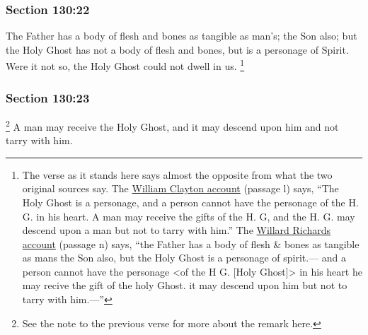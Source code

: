 	\subsubsection{Section 130:22} %
		\label{DC130-22}

		The Father has a body of flesh and bones as tangible as man's; the Son also; but the Holy Ghost has not a body of flesh and bones, but is a personage of Spirit. Were it not so, the Holy Ghost could not dwell in us.%
			\footnote{%
				The verse as it stands here says almost the opposite from what the two original sources say. The \hyperlink{EMS-1843-JS-2-APR-1843-WC-l}{William Clayton account} (passage l) says, ``The Holy Ghost is a personage, and a person cannot have the personage of the H. G. in his heart. A man may receive the gifts of the H. G, and the H. G. may descend upon a man but not to tarry with him.'' The \hyperlink{EMS-1843-JS-2-APR-1843-WR-n}{Willard Richards account} (passage n) says, ``the Father has a body of flesh \& bones as tangible as mans the Son also, but the Holy Ghost is a personage of spirit.--- and a person cannot have the personage <of the H G. [Holy Ghost]> in his heart he may recive the gift of the holy Ghost. it may descend upon him but not to tarry with him.---''
				}


	\subsubsection{Section 130:23} %
		\label{DC130-23}

			\footnote{%
				See the note to the previous verse for more about the remark here.
				}%
		A man may receive the Holy Ghost, and it may descend upon him and not tarry with him.

